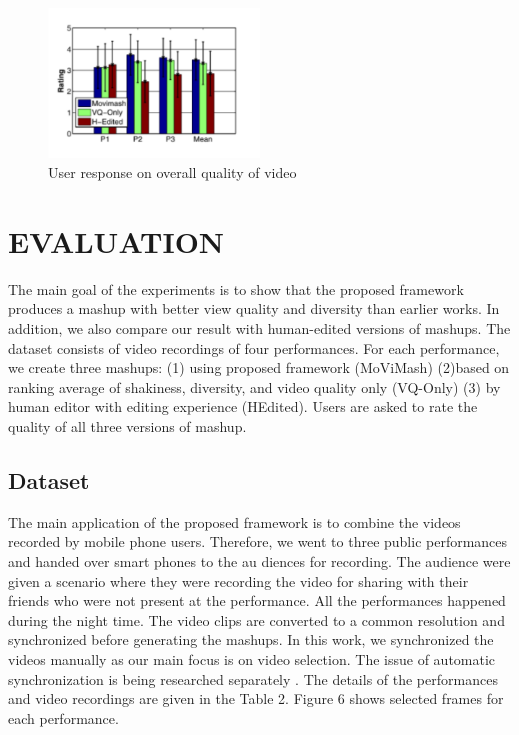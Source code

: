 \documentclass{sig-alternate}
\begin{document}
\begin{figure}[h]
    \centering
    \includegraphics[width=0.5\textwidth]{img8.png}
    \caption{User response on overall quality of video}
    \label{fig:mesh8}
\end{figure}
    
    \section{EVALUATION}
    The main goal of the experiments is to show that the proposed framework produces a mashup with better view quality and diversity than earlier works. In addition, we also compare our result with human-edited versions of mashups. The dataset consists of video recordings of four performances. For each performance, we create three mashups: (1) using proposed framework (MoViMash) (2)based on ranking average of shakiness, diversity, and video quality
    only (VQ-Only) (3) by human editor with editing experience (HEdited). Users are asked to rate the quality of all three versions of mashup.
    \subsection{Dataset}
    The main application of the proposed framework is to combine the videos recorded by mobile phone users. Therefore, we went to three public performances and handed over smart phones to the au diences for recording. The audience were given a scenario where they were recording the video for sharing with their friends who were not present at the performance. All the performances happened during the night time. The video clips are converted to a common resolution and synchronized before generating the mashups. In this work, we synchronized the videos manually as our main focus is on video selection. The issue of automatic synchronization is being researched separately \cite{14}. The details of the performances and video recordings are given in the Table 2. Figure 6 shows selected frames for each performance.
\end{document}
